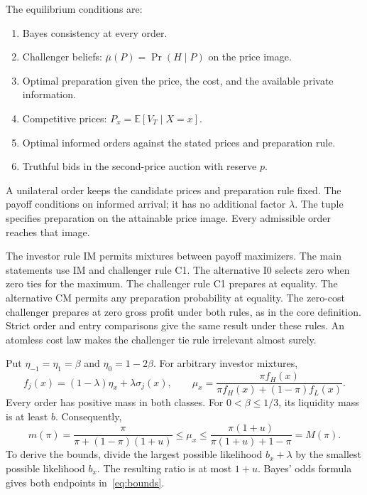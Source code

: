 \documentclass[12pt]{article}
\begin{document}
The equilibrium conditions are:
\begin{enumerate}
\item Bayes consistency at every order.
\item Challenger beliefs: $\bar\mu(P)=\Pr(H\mid P)$ on the price image.
\item Optimal preparation given the price, the cost, and the available private information.
\item Competitive prices: $P_x=\mathbb E[V_T\mid X=x]$.
\item Optimal informed orders against the stated prices and preparation rule.
\item Truthful bids in the second-price auction with reserve $p$.
\end{enumerate}

A unilateral order keeps the candidate prices and preparation rule fixed.
The payoff conditions on informed arrival; it has no additional factor $\lambda$.
The tuple specifies preparation on the attainable price image.
Every admissible order reaches that image.

The investor rule IM permits mixtures between payoff maximizers.
The main statements use IM and challenger rule C1.
The alternative I0 selects zero when zero ties for the maximum.
The challenger rule C1 prepares at equality.
The alternative CM permits any preparation probability at equality.
The zero-cost challenger prepares at zero gross profit under both rules, as in the core definition.
Strict order and entry comparisons give the same result under these rules.
An atomless cost law makes the challenger tie rule irrelevant almost surely.

Put $\eta_{-1}=\eta_1=\beta$ and $\eta_0=1-2\beta$.
For arbitrary investor mixtures,
\begin{equation}\label{eq:bayes}
 f_j(x)=(1-\lambda)\eta_x+\lambda\sigma_j(x),\qquad
 \mu_x=\frac{\pi f_H(x)}{\pi f_H(x)+(1-\pi)f_L(x)}.
\end{equation}
Every order has positive mass in both classes.
For $0<\beta\le1/3$, its liquidity mass is at least $b$.
Consequently,
\begin{equation}\label{eq:bounds}
 m(\pi)=\frac{\pi}{\pi+(1-\pi)(1+u)}
 \le\mu_x\le
 \frac{\pi(1+u)}{\pi(1+u)+1-\pi}=M(\pi).
\end{equation}
To derive the bounds, divide the largest possible likelihood $b_x+\lambda$ by the smallest possible likelihood $b_x$.
The resulting ratio is at most $1+u$.
Bayes' odds formula gives both endpoints in~\eqref{eq:bounds}.
\end{document}

